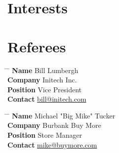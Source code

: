 \documentclass[10pt]{article} %
\begin{document}

\section{Interests}



\section{Referees}

\parbox{0.5\textwidth}{ %
    \begin{tabbing}
        \hspace{2.75cm} \= \hspace{4cm} \= \kill %
        {\bf Name} \> Bill Lumbergh \\ %
        {\bf Company} \> Initech Inc. \\ %
        {\bf Position} \> Vice President \\ %
        {\bf Contact} \> \href{mailto:bill@initech.com}{bill@initech.com} %
    \end{tabbing}}
\hfill %
\parbox{0.5\textwidth}{ %
    \begin{tabbing}
        \hspace{2.75cm} \= \hspace{4cm} \= \kill %
        {\bf Name} \> Michael "Big Mike" Tucker\\ %
        {\bf Company} \> Burbank Buy More \\ %
        {\bf Position} \> Store Manager \\ %
        {\bf Contact} \> \href{mailto:mike@buymore.com}{mike@buymore.com} %
    \end{tabbing}}

\end{document}

